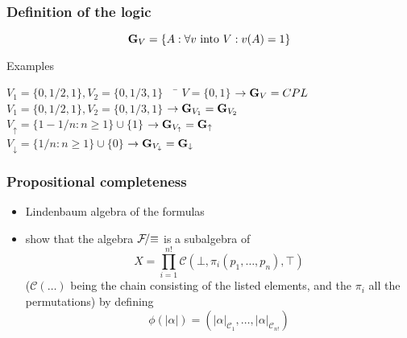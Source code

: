 \documentclass[aspectratio=169]%
  {beamer}
\newcommand{\cF}{\mathcal{F}}
\newcommand{\cC}{\mathcal{C}}
\newcommand{\suchthat}{\mathrel{:}}
\newcommand{\vup}{{\uparrow}}
\newcommand{\vdn}{{\downarrow}}
\newcommand{\gdl}[1]{{\bf G}_{#1}}
\def\Feq{{\cF\!/\mathnormal{\equiv}}}
\begin{document}
\begin{frame}
  \frametitle{Definition of the logic}

  \[ \gdl{V} = \{ A \suchthat \forall v \mbox{ into $V$}: v(A) = 1\} \]

  \pause
  \begin{block}{Examples}
    \begin{tabbing}
      $V_1 = \{0, 1/2, 1\}, V_2 = \{0, 1/3, 1\} \quad$ \=\kill
      $V = \{0,1\}$ \> $\to \gdl V = CPL$\\[4pt]
      $V_1 = \{0, 1/2, 1\}, V_2 = \{0, 1/3, 1\}$ \> 
        $\to \gdl{V_1} = \gdl{V_2}$\\[4pt]
      $V_\vup = \{1 - 1/n \suchthat n\ge1\} \cup \{1\}$ \>
        $\to \gdl{V_\vup} = \gdl\vup$\\[4pt]
      $V_\vdn = \{1/n \suchthat n\ge1\} \cup \{0\}$ \>
        $\to \gdl{V_\vdn} = \gdl\vdn$
    \end{tabbing}
  \end{block}
\end{frame}

\begin{frame}
  \frametitle{Propositional completeness}
  \begin{itemize}
  \item Lindenbaum algebra of the formulas
  \item show that the algebra $\Feq$ is a subalgebra of
    \[X = \prod_{i=1}^{n!} \cC(\bot,\pi_i(p_1,\ldots,p_n),\top)\]
    ($\cC(\ldots)$ being the chain consisting of the listed elements, and
    the $\pi_i$ all the permutations) by defining
    \[\phi(|\alpha|) = (|\alpha|_{\cC_1},\ldots,|\alpha|_{\cC_{n!}})\]
  \end{itemize}
\end{frame}



\end{document}
